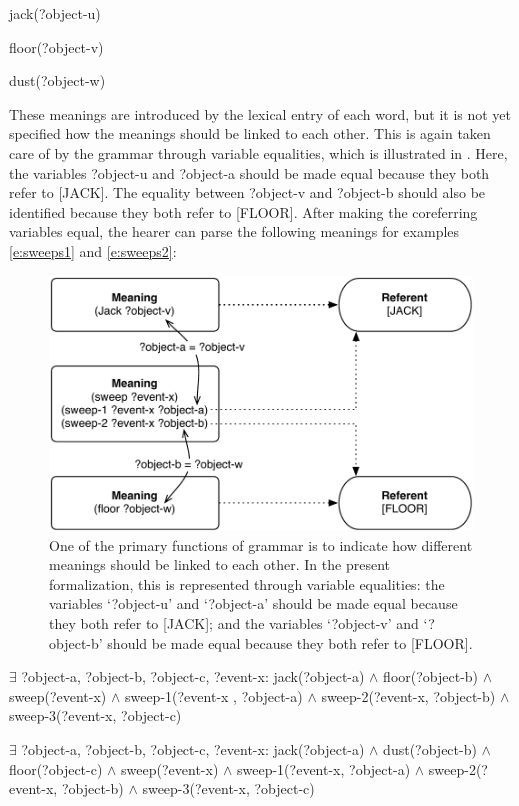 \ea
jack(?object-u)
\item floor(?object-v)
\item dust(?object-w)
\z

These meanings are introduced by the lexical entry of each word, but it is not yet specified how the meanings should be linked to each other. This is again taken care of by the grammar through variable equalities, which is illustrated in . Here, the variables ?object-u and ?object-a should be made equal because they both refer to [JACK]. The equality between ?object-v and ?object-b should also be identified because they both refer to [FLOOR]. After making the coreferring variables equal, the hearer can parse the following meanings for examples \ref{e:sweeps1} and \ref{e:sweeps2}:

\begin{figure}[t]
\centerline{\includegraphics[width=0.8\linewidth]{Chapter2/figs/sweep-1}}
  \caption[Linking the meanings of an event]{One of the primary functions of grammar is to indicate how different meanings should be linked to each other. In the present formalization, this is represented through variable equalities: the variables `?object-u' and `?object-a' should be made equal because they both refer to [JACK]; and the variables `?object-v' and `?object-b' should be made equal because they both refer to [FLOOR].}
   \label{f:linking}
\end{figure}

\ea
$\exists$ ?object-a, ?object-b, ?object-c, ?event-x: jack(?object-a) $\wedge$ floor(?object-b) $\wedge$ sweep(?event-x) $\wedge$ sweep-1(?event-x , ?object-a) $\wedge$ sweep-2(?event-x, ?object-b) $\wedge$ sweep-3(?event-x, ?object-c)
\item $\exists$ ?object-a, ?object-b, ?object-c, ?event-x: jack(?object-a) $\wedge$ dust(?object-b) $\wedge$ floor(?object-c) $\wedge$ sweep(?event-x) $\wedge$ sweep-1(?event-x, ?object-a) $\wedge$ sweep-2(?event-x, ?object-b) $\wedge$ sweep-3(?event-x, ?object-c)
\z

